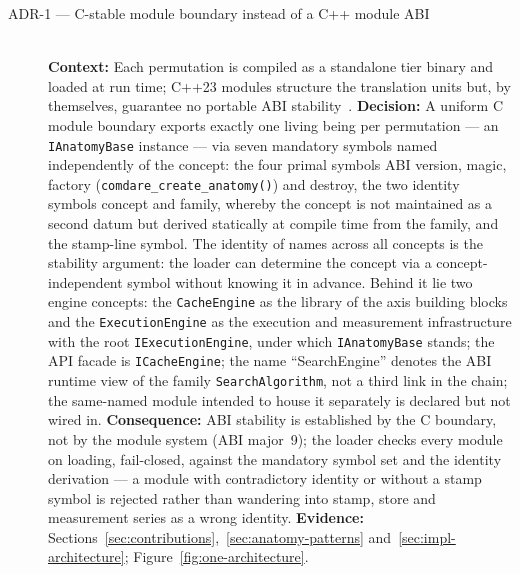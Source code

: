 \begin{description}

  \item[ADR-1 --- C-stable module boundary instead of a C++ module ABI]\hfill\\
  \textbf{Context:} Each permutation is compiled as a standalone tier binary and loaded at run
  time; C++23 modules structure the translation units but, by themselves, guarantee no portable
  ABI stability~\cite{wg21_modules_abi}.
  \textbf{Decision:} A uniform C module boundary exports exactly one living being per permutation
  --- an \texttt{IAnatomyBase} instance --- via seven mandatory symbols named independently of the
  concept: the four primal symbols ABI version, magic, factory (\texttt{comdare\_create\_anatomy()})
  and destroy, the two identity symbols concept and family, whereby the concept is not maintained as a
  second datum but derived statically at compile time from the family, and the stamp-line symbol. The
  identity of names across all concepts is the stability argument: the loader can determine the
  concept via a concept-independent symbol without knowing it in advance. Behind it lie two engine
  concepts: the \texttt{CacheEngine} as the library of the axis building blocks and the
  \texttt{ExecutionEngine} as the execution and measurement infrastructure with the root
  \texttt{IExecutionEngine}, under which \texttt{IAnatomyBase} stands; the API facade is
  \texttt{ICacheEngine}; the name \enquote{SearchEngine} denotes the ABI runtime view of the family
  \texttt{SearchAlgorithm}, not a third link in the chain; the same-named module intended to house it
  separately is declared but not wired in.
  \textbf{Consequence:} ABI stability is established by the C boundary, not by the module system
  (ABI major~9); the loader checks every module on loading, fail-closed, against the mandatory
  symbol set and the identity derivation --- a module with contradictory identity or without a stamp
  symbol is rejected rather than wandering into stamp, store and measurement series as a wrong
  identity.
  \textbf{Evidence:} Sections~\ref{sec:contributions},~\ref{sec:anatomy-patterns}
  and~\ref{sec:impl-architecture}; Figure~\ref{fig:one-architecture}.


\end{description}
